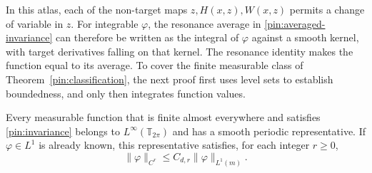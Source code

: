 In this atlas, each of the non-target maps $z,H(x,z),W(x,z)$ permits
a change of variable in $z$. For integrable $\varphi$, the resonance
average in \eqref{pin:averaged-invariance} can therefore be written as
the integral of $\varphi$ against a smooth kernel, with target
derivatives falling on that kernel. The resonance identity makes the
function equal to its average. To cover the finite measurable class of
Theorem~\ref{pin:classification}, the next proof first uses level sets
to establish boundedness, and only then integrates function values.

\begin{lemma}
\label{pin:regularization}
Every measurable function that is finite almost everywhere and satisfies
\eqref{pin:invariance} belongs to $L^\infty(\mathbb T_{2\pi})$ and
has a smooth periodic representative. If $\varphi\in L^1$ is already
known, this representative satisfies, for each integer $r\ge0$,
\begin{equation}
                  \|\varphi\|_{C^r}\le C_{d,r}\|\varphi\|_{L^1(m)}.
 \label{pin:smoothing-bound}
\end{equation}
\end{lemma}

